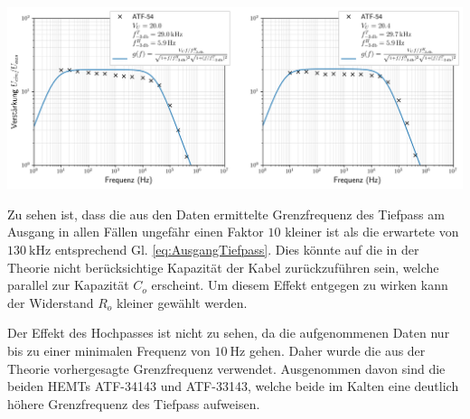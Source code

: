 \begin{minipage}[!c]{\textwidth}
\begin{minipage}[c]{\textwidth}
\includegraphics[width=\textwidth]{./fig/Gain/G54.png}

\label{fig:Gain}
\end{minipage}
\end{minipage}
\clearpage

Zu sehen ist, dass die aus den Daten ermittelte Grenzfrequenz des Tiefpass am Ausgang in allen Fällen ungefähr einen Faktor $10$ kleiner ist als die erwartete von $\SI{130}{\kilo\hertz}$ entsprechend Gl. \eqref{eq:AusgangTiefpass}.
Dies könnte auf die in der Theorie nicht berücksichtige Kapazität der Kabel zurückzuführen sein, welche parallel zur Kapazität $C_o$ erscheint.
Um diesem Effekt entgegen zu wirken kann der Widerstand $R_o$ kleiner gewählt werden.

Der Effekt des Hochpasses ist nicht zu sehen, da die aufgenommenen Daten nur bis zu einer minimalen Frequenz von $\SI{10}{\hertz}$ gehen.
Daher wurde die aus der Theorie vorhergesagte Grenzfrequenz verwendet.
Ausgenommen davon sind die beiden HEMTs ATF-34143 und ATF-33143, welche beide im Kalten eine deutlich höhere Grenzfrequenz des Tiefpass aufweisen.

